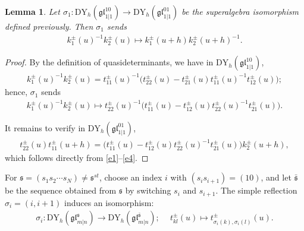 \documentclass[a4paper,12pt]{article}
\newtheorem{lemm}[theo]{Lemma}
\numberwithin{equation}{section}
\begin{document}
\begin{lemm} \label{map DY10}
Let $\sigma_{1}: \mathrm{DY}_{h}(\mathfrak{gl}_{1|1}^{10})\rightarrow \mathrm{DY}_{h}(\mathfrak{gl}_{1|1}^{01})$ be the superalgebra isomorphism defined previously. Then $\sigma_1$ sends
\begin{align*}
k_{1}^{\pm }(u)^{-1}k_{2}^{\pm }(u)\mapsto k_{1}^{\pm }(u+h)k_{2}^{\pm }(u+h)^{-1}.
\end{align*}
\end{lemm}
\begin{proof}
By the definition of quasideterminants, we have in $\mathrm{DY}_{h}(\mathfrak{gl}_{1|1}^{10})$,
\begin{align*}
k_{1}^{\pm }(u)^{-1}k_{2}^{\pm }(u)=t_{11}^{\pm }(u)^{-1}\Big(t_{22}^{\pm }(u)-t_{21}^{\pm }(u)t_{11}^{\pm }(u)^{-1}t_{12}^{\pm }(u)\Big);
\end{align*}
hence, $\sigma_1$ sends
\begin{align*}
k_{1}^{\pm}(u)^{-1}k_{2}^{\pm}(u)\mapsto t_{22}^{\pm }(u)^{-1}
\Big(t_{11}^{\pm }(u)-t_{12}^{\pm }(u)t_{22}^{\pm}(u)^{-1}t_{21}^{\pm }(u)\Big).
\end{align*}

It remains to verify in $\mathrm{DY}_{h}(\mathfrak{gl}_{1|1}^{01})$,
\begin{gather*}
    t_{22}^{\pm}(u)t_{11}^{\pm }(u+h)=\Big(t_{11}^{\pm}(u)-t_{12}^{\pm}(u)t_{22}^{\pm}(u)^{-1}t_{21}^{\pm}(u)\Big)k_{2}^{\pm}(u+h),
\end{gather*}
which follows directly from \eqref{e1}–\eqref{e4}.
\end{proof}

For $\mathfrak{s}=(s_1 s_{2} \cdots s_{N})\neq \mathfrak{s}^{st}$, choose an index $i$ with $(s_{i}s_{i+1})=(10)$, and let $\bar{\mathfrak{s}}$ be the sequence obtained from $\mathfrak{s}$ by switching $s_{i}$ and $s_{i+1}$. The simple reflection $\sigma_{i}=(i,i+1)$ induces an isomorphism:
\begin{align*}
\sigma_{i}: \mathrm{DY}_{h}(\mathfrak{gl}_{m|n}^{\mathfrak{s}})\rightarrow \mathrm{DY}_{h}(\mathfrak{gl}_{m|n}^{\bar{\mathfrak{s}}});\quad~
 t_{kl}^{\pm }(u)\mapsto t_{\sigma_{i}(k),\sigma_{i}(l)}^{\pm}(u).
\end{align*}
 
\end{document}
